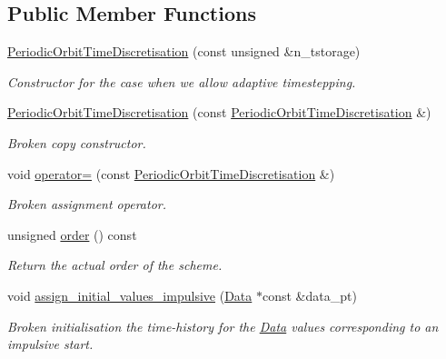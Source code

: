 \subsection*{Public Member Functions}
\begin{DoxyCompactItemize}
\item 
\hyperlink{classoomph_1_1PeriodicOrbitTimeDiscretisation_a7167c51f5a15cd10f9cf1d534534d0ab}{Periodic\+Orbit\+Time\+Discretisation} (const unsigned \&n\+\_\+tstorage)
\begin{DoxyCompactList}\small\item\em Constructor for the case when we allow adaptive timestepping. \end{DoxyCompactList}\item 
\hyperlink{classoomph_1_1PeriodicOrbitTimeDiscretisation_ae5aa461a5d284736975fb3d41e769be0}{Periodic\+Orbit\+Time\+Discretisation} (const \hyperlink{classoomph_1_1PeriodicOrbitTimeDiscretisation}{Periodic\+Orbit\+Time\+Discretisation} \&)
\begin{DoxyCompactList}\small\item\em Broken copy constructor. \end{DoxyCompactList}\item 
void \hyperlink{classoomph_1_1PeriodicOrbitTimeDiscretisation_a2d0767948e0120cf8e913bd52c459940}{operator=} (const \hyperlink{classoomph_1_1PeriodicOrbitTimeDiscretisation}{Periodic\+Orbit\+Time\+Discretisation} \&)
\begin{DoxyCompactList}\small\item\em Broken assignment operator. \end{DoxyCompactList}\item 
unsigned \hyperlink{classoomph_1_1PeriodicOrbitTimeDiscretisation_a395bce926ad4a0dfb474aaf05f607b99}{order} () const
\begin{DoxyCompactList}\small\item\em Return the actual order of the scheme. \end{DoxyCompactList}\item 
void \hyperlink{classoomph_1_1PeriodicOrbitTimeDiscretisation_a45c5cd901ddf52fb1566665a2e161497}{assign\+\_\+initial\+\_\+values\+\_\+impulsive} (\hyperlink{classoomph_1_1Data}{Data} $\ast$const \&data\+\_\+pt)
\begin{DoxyCompactList}\small\item\em Broken initialisation the time-\/history for the \hyperlink{classoomph_1_1Data}{Data} values corresponding to an impulsive start. \end{DoxyCompactList}\item 

\end{DoxyCompactItemize}

